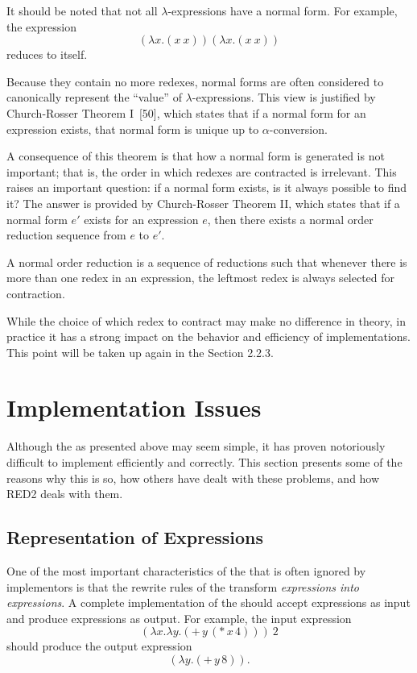 It should be noted that not all \(\lambda\)-expressions have a normal form. For
example, the expression
\[
(\lambda x.(x\ x))(\lambda x.(x\ x))
\]
reduces to itself.

Because they contain no more redexes, normal forms are often considered to
canonically represent the ``value'' of \(\lambda\)-expressions. This view is
justified by Church-Rosser Theorem I~[50], which states that if a normal form
for an expression exists, that normal form is unique up to \(\alpha\)-conversion.

A consequence of this theorem is that how a normal form is generated is not
important; that is, the order in which redexes are contracted is irrelevant.
This raises an important question: if a normal form exists, is it always
possible to find it? The answer is provided by Church-Rosser Theorem II, which
states that if a normal form \(e'\) exists for an expression \(e\), then there
exists a normal order reduction sequence from \(e\) to \(e'\).

\begin{definition}
A normal order reduction is a sequence of reductions such that whenever there is
more than one redex in an expression, the leftmost redex is always selected for
contraction.
\end{definition}

While the choice of which redex to contract may make no difference in theory, in
practice it has a strong impact on the behavior and efficiency of
\lambdacalculus{} implementations. This point will be taken up again in the
Section 2.2.3.

\section{Implementation Issues}

Although the \lambdacalculus{} as presented above may seem simple, it has proven
notoriously difficult to implement efficiently and correctly. This section
presents some of the reasons why this is so, how others have dealt with these
problems, and how RED2 deals with them.

\subsection{Representation of Expressions}

One of the most important characteristics of the \lambdacalculus{} that is often
ignored by implementors is that the rewrite rules of the \lambdacalculus{}
transform \emph{expressions into expressions}. A complete implementation of the
\lambdacalculus{} should accept expressions as input and produce expressions as
output. For example, the input expression
\[
(\lambda x.\lambda y.(+\,y\,(*\,x\,4)))\ 2
\]
should produce the output expression
\[
(\lambda y.(+\,y\,8)).
\]

